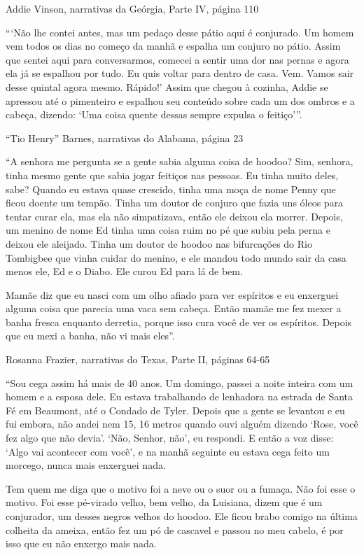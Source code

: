 Addie Vinson, narrativas da Geórgia, Parte IV, página 110

```Não lhe contei antes, mas um pedaço desse pátio aqui é conjurado. Um
homem vem todos os dias no começo da manhã e espalha um conjuro no
pátio. Assim que sentei aqui para conversarmos, comecei a sentir uma dor
nas pernas e agora ela já se espalhou por tudo. Eu quis voltar para
dentro de casa. Vem. Vamos sair desse quintal agora mesmo. Rápido!'
Assim que chegou à cozinha, Addie se apressou até o pimenteiro e
espalhou seu conteúdo sobre cada um dos ombros e a cabeça, dizendo: `Uma
coisa quente dessas sempre expulsa o feitiço'''.

``Tio Henry'' Barnes, narrativas do Alabama, página 23

``A senhora me pergunta se a gente sabia alguma coisa de hoodoo? Sim,
senhora, tinha mesmo gente que sabia jogar feitiços nas pessoas. Eu
tinha muito deles, sabe? Quando eu estava quase crescido, tinha uma moça
de nome Penny que ficou doente um tempão. Tinha um doutor de conjuro que
fazia uns óleos para tentar curar ela, mas ela não simpatizava, então
ele deixou ela morrer. Depois, um menino de nome Ed tinha uma coisa ruim
no pé que subiu pela perna e deixou ele aleijado. Tinha um doutor de
hoodoo nas bifurcações do Rio Tombigbee que vinha cuidar do menino, e
ele mandou todo mundo sair da casa menos ele, Ed e o Diabo. Ele curou Ed
para lá de bem.

Mamãe diz que eu nasci com um olho afiado para ver espíritos e eu
enxerguei alguma coisa que parecia uma vaca sem cabeça. Então mamãe me
fez mexer a banha fresca enquanto derretia, porque isso cura você de ver
os espíritos. Depois que eu mexi a banha, não vi mais eles''.

Rosanna Frazier, narrativas do Texas, Parte II, páginas 64-65

``Sou cega assim há mais de 40 anos. Um domingo, passei a noite inteira
com um homem e a esposa dele. Eu estava trabalhando de lenhadora na
estrada de Santa Fé em Beaumont, até o Condado de Tyler. Depois que a
gente se levantou e eu fui embora, não andei nem 15, 16 metros quando
ouvi alguém dizendo `Rose, você fez algo que não devia'. `Não, Senhor,
não', eu respondi. E então a voz disse: `Algo vai acontecer com você', e
na manhã seguinte eu estava cega feito um morcego, nunca mais enxerguei
nada.

Tem quem me diga que o motivo foi a neve ou o suor ou a fumaça. Não foi
esse o motivo. Foi esse pé-virado velho, bem velho, da Luisiana, dizem
que é um conjurador, um desses negros velhos do hoodoo. Ele ficou brabo
comigo na última colheita da ameixa, então fez um pó de cascavel e
passou no meu cabelo, é por isso que eu não enxergo mais nada.

